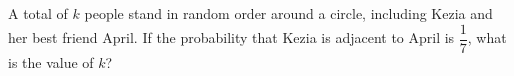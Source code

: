 A total of $k$ people stand in random order around a circle, including Kezia and her best friend April. If the probability that Kezia is adjacent to April is $\dfrac{1}{7}$, what is the value of $k$?
